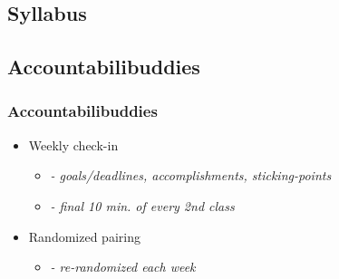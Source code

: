 \documentclass{beamer}
\begin{document}

\subsection{Syllabus}


\subsection{Accountabilibuddies}

\begin{frame}
  \frametitle{Accountabilibuddies}

  \begin{itemize}
    \item Weekly check-in
    \begin{itemize}
      \item[] \emph{- goals/deadlines, accomplishments, sticking-points}
      \item[] \emph{- final 10 min. of every 2nd class}
    \end{itemize}
    \item Randomized pairing
    \begin{itemize}
      \item[] \emph{- re-randomized each week}
    \end{itemize}
  \end{itemize}

\end{frame}



\end{document}
